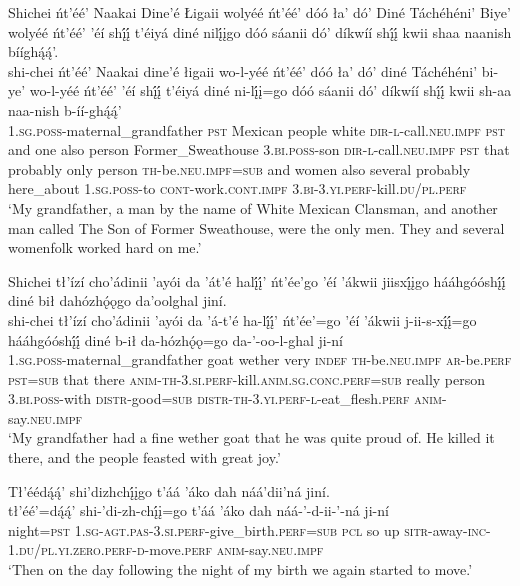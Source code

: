 \largerpage
\ea\label{ex:text1-2-3}
Shichei ńt’éé’ Naakai Dine’é Łigaii wolyéé ńt’éé’ dóó ła’ dó’ Diné Táchéhéni’ Biye’ wolyéé ńt’éé’ ’éí shį́į́ t’éiyá diné nilį́įgo dóó sáanii dó’ díkwíí shį́į́ kwii shaa naanish bííghą́ą́’.\\
\gll shi-chei	ńt’éé’	Naakai	dine’é	łigaii	wo-l-yéé	ńt’éé’	dóó	ła’	dó’	diné	Táchéhéni’	bi-ye’	wo-l-yéé	ńt’éé’	’éí	shį́į́	t’éiyá	diné	ni-lį́į=go	dóó	sáanii	dó’	díkwíí	shį́į́	kwii	sh-aa	naa-nish	b-íí-ghą́ą́’\\
     1.\textsc{sg}.\textsc{poss}-maternal\_grandfather	\textsc{pst}	Mexican	people	white	\textsc{dir}-\textsc{l}-call.\textsc{neu}.\textsc{impf}	\textsc{pst}	and	one	also	person	Former\_Sweathouse	3.\textsc{bi}.\textsc{poss}-son	\textsc{dir}-\textsc{l}-call.\textsc{neu}.\textsc{impf}	\textsc{pst}	that	probably	only	person	\textsc{th}-be.\textsc{neu}.\textsc{impf}=\textsc{sub}	and	women	also	several	probably	here\_about	1.\textsc{sg}.\textsc{poss}-to	\textsc{cont}-work.\textsc{cont}.\textsc{impf}	3.\textsc{bi}-3.\textsc{yi}.\textsc{perf}-kill.\textsc{du}/\textsc{pl}.\textsc{perf}\\
\glt `My grandfather, a man by the name of White Mexican Clansman, and another man called The Son of Former Sweathouse, were the only men. They and several womenfolk worked hard on me.'
\z

\ea\label{ex:text1-3-1}
Shichei tł’ízí cho’ádinii ’ayói da ’át’é halį́į́’ ńt’ée’go ’éí ’ákwii jiisxį́įgo hááhgóóshį́į́ diné bił dahózhǫ́ǫgo da’oolghal jiní.\\
\gll shi-chei	tł’ízí	cho’ádinii	’ayói	da	’á-t’é	ha-lį́į́’	ńt’ée’=go	’éí	’ákwii	j-ii-s-xį́į́=go	hááhgóóshį́į́	diné	b-ił	da-hózhǫ́ǫ=go	da-’-oo-l-ghal	ji-ní\\
     1.\textsc{sg}.\textsc{poss}-maternal\_grandfather	goat	wether	very		\textsc{indef}	\textsc{th}-be.\textsc{neu}.\textsc{impf}	\textsc{ar}-be.\textsc{perf}	\textsc{pst}=\textsc{sub}	that	there	\textsc{anim}-\textsc{th}-3.\textsc{si}.\textsc{perf}-kill.\textsc{anim}.\textsc{sg}.\textsc{conc}.\textsc{perf}=\textsc{sub}	really	person	3.\textsc{bi}.\textsc{poss}-with	\textsc{distr}-good=\textsc{sub}	\textsc{distr}-\textsc{th}-3.\textsc{yi}.\textsc{perf}-\textsc{l}-eat\_flesh.\textsc{perf}	\textsc{anim}-say.\textsc{neu}.\textsc{impf}\\
\glt `My grandfather had a fine wether goat that he was quite proud of. He killed it there, and the people feasted with great joy.'
\z

\ea\label{ex:text1-3-2}
Tł’éédą́ą́’ shi’dizhchį́įgo t’áá ’áko dah náá’dii’ná jiní.\\
\gll tł’éé’=dą́ą́’	shi-’di-zh-chį́į=go	t’áá	’áko	dah	náá-’-d-ii-’-ná	ji-ní\\
     night=\textsc{pst}	1.\textsc{sg}-\textsc{agt}.\textsc{pas}-3.\textsc{si}.\textsc{perf}-give\_birth.\textsc{perf}=\textsc{sub}	\textsc{pcl}	so	up	\textsc{sitr}-away-\textsc{inc}-1.\textsc{du}/\textsc{pl}.\textsc{yi}.\textsc{zero}.\textsc{perf}-\textsc{d}-move.\textsc{perf}	\textsc{anim}-say.\textsc{neu}.\textsc{impf}\\
\glt `Then on the day following the night of my birth we again started to move.'
\z

